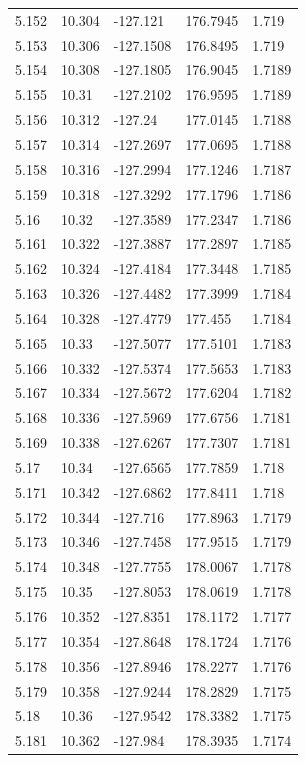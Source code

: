 \begin{tabular}{lllll}
5.152 & 10.304 & -127.121 & 176.7945 & 1.719 \\
5.153 & 10.306 & -127.1508 & 176.8495 & 1.719 \\
5.154 & 10.308 & -127.1805 & 176.9045 & 1.7189 \\
5.155 & 10.31 & -127.2102 & 176.9595 & 1.7189 \\
5.156 & 10.312 & -127.24 & 177.0145 & 1.7188 \\
5.157 & 10.314 & -127.2697 & 177.0695 & 1.7188 \\
5.158 & 10.316 & -127.2994 & 177.1246 & 1.7187 \\
5.159 & 10.318 & -127.3292 & 177.1796 & 1.7186 \\
5.16 & 10.32 & -127.3589 & 177.2347 & 1.7186 \\
5.161 & 10.322 & -127.3887 & 177.2897 & 1.7185 \\
5.162 & 10.324 & -127.4184 & 177.3448 & 1.7185 \\
5.163 & 10.326 & -127.4482 & 177.3999 & 1.7184 \\
5.164 & 10.328 & -127.4779 & 177.455 & 1.7184 \\
5.165 & 10.33 & -127.5077 & 177.5101 & 1.7183 \\
5.166 & 10.332 & -127.5374 & 177.5653 & 1.7183 \\
5.167 & 10.334 & -127.5672 & 177.6204 & 1.7182 \\
5.168 & 10.336 & -127.5969 & 177.6756 & 1.7181 \\
5.169 & 10.338 & -127.6267 & 177.7307 & 1.7181 \\
5.17 & 10.34 & -127.6565 & 177.7859 & 1.718 \\
5.171 & 10.342 & -127.6862 & 177.8411 & 1.718 \\
5.172 & 10.344 & -127.716 & 177.8963 & 1.7179 \\
5.173 & 10.346 & -127.7458 & 177.9515 & 1.7179 \\
5.174 & 10.348 & -127.7755 & 178.0067 & 1.7178 \\
5.175 & 10.35 & -127.8053 & 178.0619 & 1.7178 \\
5.176 & 10.352 & -127.8351 & 178.1172 & 1.7177 \\
5.177 & 10.354 & -127.8648 & 178.1724 & 1.7176 \\
5.178 & 10.356 & -127.8946 & 178.2277 & 1.7176 \\
5.179 & 10.358 & -127.9244 & 178.2829 & 1.7175 \\
5.18 & 10.36 & -127.9542 & 178.3382 & 1.7175 \\
5.181 & 10.362 & -127.984 & 178.3935 & 1.7174 \\

\end{tabular}
